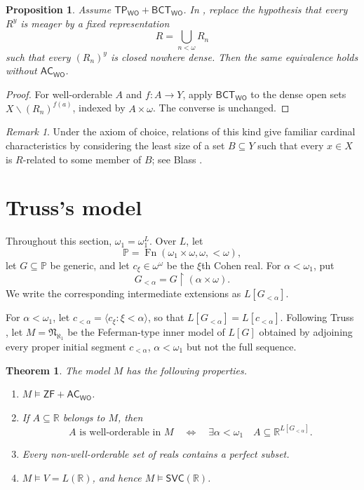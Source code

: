 \documentclass[11pt,reqno]{amsart}
\newcommand{\R}{\mathbb R}
\newcommand{\WO}{\mathsf{WO}}
\newcommand{\Fn}{\operatorname{Fn}}
\newcommand{\restr}{\mathbin{\upharpoonright}}
\newcommand{\BCTWO}{\mathsf{BCT}_{\WO}}
\newcommand{\TP}{\mathsf{TP}_{\WO}}
\theoremstyle{plain}
\newtheorem{theorem}{Theorem}[section]
\newtheorem{proposition}[proposition]{Proposition}
\theoremstyle{definition}
\theoremstyle{remark}
\newtheorem{remark}[remark]{Remark}
\begin{document}
\begin{proposition}\label{prop:uniform-sections}
Assume $\TP+\BCTWO$.  In , replace the hypothesis
that every $R^y$ is meager by a fixed representation
\[
 R=\bigcup_{n<\omega}R_n
\]
such that every $(R_n)^y$ is closed nowhere dense.  Then the same equivalence
holds without $\mathsf{AC}_{\WO}$.
\end{proposition}

\begin{proof}
For well-orderable $A$ and $f:A\to Y$, apply $\BCTWO$ to the dense open
sets $X\smallsetminus(R_n)^{f(a)}$, indexed by $A\times\omega$.  The converse is
unchanged.
\end{proof}

\begin{remark}\label{rem:relations-literature}
Under the axiom of choice, relations of this kind give familiar cardinal characteristics by considering the least size of a set $B\subseteq Y$ such that every $x\in X$ is $R$-related to some member of $B$; see Blass \cite{Blass1996}.
\end{remark}

\section{Truss's model}\label{sec:model}

 Throughout this section, $\omega_1=\omega_1^L$.  Over $L$, let
\[
 \mathbb P=\Fn(\omega_1\times\omega,\omega,{<}\omega),
\]
let $G\subseteq\mathbb P$ be generic, and let $c_\xi\in\omega^\omega$ be the
$\xi$th Cohen real.  For $\alpha<\omega_1$, put
\[
 G_{<\alpha}=G\restr(\alpha\times\omega).
\]
We write the corresponding intermediate extensions as $L[G_{<\alpha}]$.

For $\alpha<\omega_1$, let $c_{<\alpha}=\langle c_\xi:\xi<\alpha\rangle$, so that $L[G_{<\alpha}]=L[c_{<\alpha}]$.
Following Truss \cite{Truss1974}, let $M=\mathfrak N_{\aleph_1}$ be the Feferman-type inner model of $L[G]$ obtained by adjoining every proper initial segment $c_{<\alpha}$, $\alpha<\omega_1$ but not the full sequence.

\begin{theorem}\label{thm:truss}
The model $M$ has the following properties.
\begin{enumerate}
\item $M\models\mathsf{ZF}+\mathsf{AC}_{\WO}$.
\item If $A\subseteq\R$ belongs to $M$, then
\[
A\text{ is well-orderable in }M
\quad\Longleftrightarrow\quad
\exists\alpha<\omega_1\quad A\subseteq\R^{L[G_{<\alpha}]}.
\]
\item Every non-well-orderable set of reals contains a perfect subset.
\item $M\models V=L(\R)$, and hence $M\models\mathsf{SVC}(\R)$.
\end{enumerate}
\end{theorem}
\end{document}
